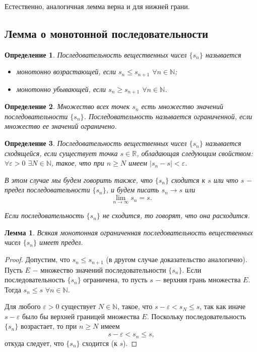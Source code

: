 \documentclass{article}
\newtheorem*{lemma}{Лемма}
\newtheorem{definition}{Определение}[section]
\begin{document}
Естественно, аналогичная лемма верна и для нижней грани.

\subsection{Лемма о монотонной последовательности}

\begin{definition}
Последовательность вещественных чисел \(\{s_n\}\) называется
\begin{itemize}
    \item монотонно возрастающей, если \(s_n \leq s_{n + 1}\) \(\forall n \in \mathbb{N}\);
    \item монотонно убывающей, если \(s_n \geq s_{n + 1}\) \(\forall n \in \mathbb{N}\).
\end{itemize}
\end{definition}

\begin{definition}
Множество всех точек \(s_n\) есть множество значений последовательности \(\{s_n\}\). Последовательность называется ограниченной, если множество ее значений ограничено.
\end{definition}

\begin{definition}
Последовательность вещественных чисел \(\{s_n\}\) называется сходящейся, если существует точка \(s \in \mathbb{R}\), обладающая следующим свойством: \(\forall \varepsilon > 0\) \(\exists N \in \mathbb{N}\), такое, что при \(n \geq N\) имеем \(| s_n - s| < \varepsilon\).

В этом случае мы будем говорить также, что \(\{s_n\}\) сходится к \(s\) или что \(s\) \(-\) предел последовательности \(\{s_n\}\), и будем писать \(s_n \to s\) или
\[
\lim_{n \to \infty} s_n = s.
\]

Если последовательность \(\{s_n\}\) не сходится, то говорят, что она расходится.
\end{definition}

\begin{lemma}
Всякая монотонная ограниченная последовательность вещественных чисел \(\{s_n\}\) имеет предел.
\end{lemma}

\begin{proof}
Допустим, что \(s_n \leq s_{n + 1}\) (в другом случае доказательство аналогично). Пусть \(E\) \(-\) множество значений последовательности \(\{s_n\}\). Если последовательность \(\{s_n\}\) ограничена, то пусть \(s\) \(-\) верхняя грань множества \(E\). Тогда \(s_n \leq s\) \(\forall n \in \mathbb{N}\).

Для любого \(\varepsilon > 0\) существует \(N \in \mathbb{N}\), такое, что \(s - \varepsilon < s_N \leq s\), так как иначе \(s - \varepsilon\) было бы верхней границей множества \(E\). Поскольку последовательность \(\{s_n\}\) возрастает, то при \(n \geq N\) имеем
\[
s - \varepsilon < s_n \leq s,
\]
откуда следует, что \(\{s_n\}\) сходится (к \(s\)).
\end{proof}
\end{document}
